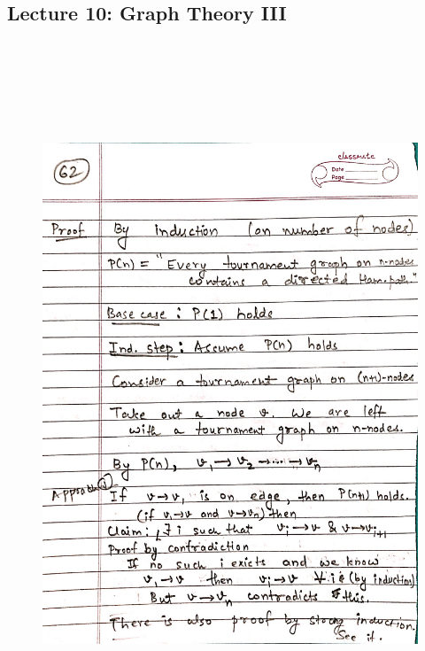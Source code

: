 \newpage
{\color{black} \subsection*{Lecture 10: Graph Theory III}}
\begin{figure}[H]
    \centering
    \includegraphics[width=16cm, height=21cm]{"./MIT-6.042J/MIT-6042J-062"}
\end{figure}

